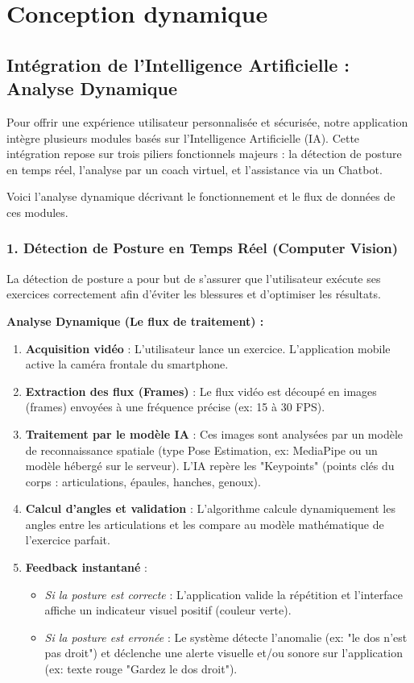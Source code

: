 \section{Conception dynamique}

\subsection{Intégration de l'Intelligence Artificielle : Analyse Dynamique}

Pour offrir une expérience utilisateur personnalisée et sécurisée, notre application intègre plusieurs modules basés sur l'Intelligence Artificielle (IA). Cette intégration repose sur trois piliers fonctionnels majeurs : la détection de posture en temps réel, l'analyse par un coach virtuel, et l'assistance via un Chatbot.

Voici l'analyse dynamique décrivant le fonctionnement et le flux de données de ces modules.

\subsubsection{1. Détection de Posture en Temps Réel (Computer Vision)}
La détection de posture a pour but de s'assurer que l'utilisateur exécute ses exercices correctement afin d'éviter les blessures et d'optimiser les résultats.

\textbf{Analyse Dynamique (Le flux de traitement) :}
\begin{enumerate}
    \item \textbf{Acquisition vidéo} : L'utilisateur lance un exercice. L'application mobile active la caméra frontale du smartphone.
    \item \textbf{Extraction des flux (Frames)} : Le flux vidéo est découpé en images (frames) envoyées à une fréquence précise (ex: 15 à 30 FPS).
    \item \textbf{Traitement par le modèle IA} : Ces images sont analysées par un modèle de reconnaissance spatiale (type Pose Estimation, ex: MediaPipe ou un modèle hébergé sur le serveur). L'IA repère les "Keypoints" (points clés du corps : articulations, épaules, hanches, genoux).
    \item \textbf{Calcul d'angles et validation} : L'algorithme calcule dynamiquement les angles entre les articulations et les compare au modèle mathématique de l'exercice parfait.
    \item \textbf{Feedback instantané} :
    \begin{itemize}
        \item \textit{Si la posture est correcte} : L'application valide la répétition et l'interface affiche un indicateur visuel positif (couleur verte).
        \item \textit{Si la posture est erronée} : Le système détecte l'anomalie (ex: "le dos n'est pas droit") et déclenche une alerte visuelle et/ou sonore sur l'application (ex: texte rouge "Gardez le dos droit").
    \end{itemize}
\end{enumerate}

